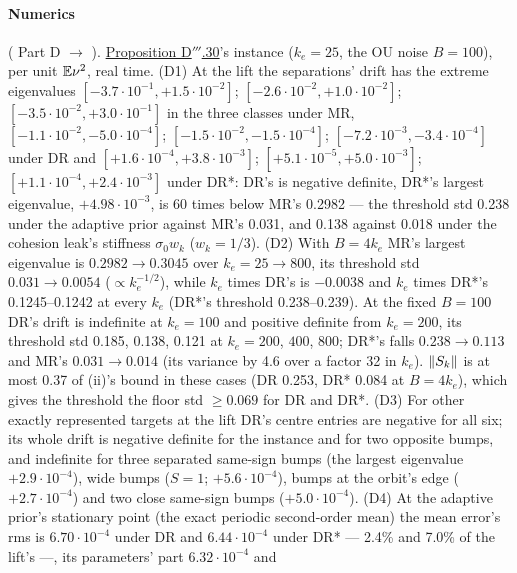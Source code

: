 \begin{sloppypar}
\paragraph{Numerics} ( Part D $\to$ ).
\hyperref[res:thmDppp:30]{Proposition D$'''$.30}'s instance ($k_e = 25$, the OU noise $B = 100$), per unit
$\mathbb{E}\nu^2$, real time. (D1) At the lift the separations' drift has the extreme eigenvalues
$[-3.7\cdot10^{-1},+1.5\cdot10^{-2}]$; $[-2.6\cdot10^{-2},+1.0\cdot10^{-2}]$; $[-3.5\cdot10^{-2},+3.0\cdot10^{-1}]$ in
the three classes under MR, $[-1.1\cdot10^{-2},-5.0\cdot10^{-4}]$; $[-1.5\cdot10^{-2},-1.5\cdot10^{-4}]$;
$[-7.2\cdot10^{-3},-3.4\cdot10^{-4}]$ under DR and $[+1.6\cdot10^{-4},+3.8\cdot10^{-3}]$;
$[+5.1\cdot10^{-5},+5.0\cdot10^{-3}]$; $[+1.1\cdot10^{-4},+2.4\cdot10^{-3}]$ under DR*: DR's is negative definite,
DR*'s largest eigenvalue, $+4.98\cdot10^{-3}$, is 60 times below MR's 0.2982 --- the threshold std 0.238 under the
adaptive prior against MR's 0.031, and 0.138 against 0.018 under the cohesion leak's stiffness $\sigma_0w_k$
($w_k = 1/3$). (D2) With $B = 4k_e$ MR's largest eigenvalue is $0.2982\to0.3045$ over $k_e = 25\to800$, its threshold
std $0.031\to0.0054$ ($\propto k_e^{-1/2}$), while $k_e$ times DR's is $-0.0038$ and $k_e$ times DR*'s
0.1245--0.1242 at every $k_e$ (DR*'s threshold 0.238--0.239). At the fixed $B = 100$ DR's drift is indefinite at
$k_e = 100$ and positive definite from $k_e = 200$, its threshold std 0.185, 0.138, 0.121 at $k_e = 200$, $400$, $800$;
DR*'s falls $0.238\to0.113$ and MR's $0.031\to0.014$ (its variance by 4.6 over a factor 32 in $k_e$). $\lVert S_k\rVert$ is
at most 0.37 of (ii)'s bound in these cases (DR 0.253, DR* 0.084 at $B = 4k_e$), which gives the threshold the floor
std $\ge0.069$ for DR and DR*. (D3) For other exactly represented targets at the lift DR's centre entries are negative
for all six; its whole drift is negative definite for the instance and for two opposite bumps, and indefinite for three
separated same-sign bumps (the largest eigenvalue $+2.9\cdot10^{-4}$), wide bumps ($S = 1$; $+5.6\cdot10^{-4}$), bumps
at the orbit's edge ($+2.7\cdot10^{-4}$) and two close same-sign bumps ($+5.0\cdot10^{-4}$). (D4) At the adaptive
prior's stationary point (the exact periodic second-order mean) the mean error's rms is $6.70\cdot10^{-4}$ under DR
and $6.44\cdot10^{-4}$ under DR* --- 2.4\% and 7.0\% of the lift's ---, its parameters' part $6.32\cdot10^{-4}$ and

\end{sloppypar}
